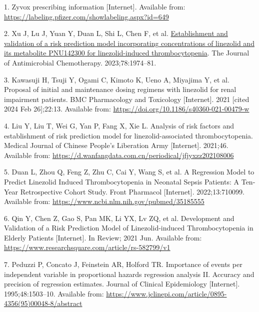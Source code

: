 \documentclass[
  letterpaper,
  DIV=11,
  numbers=noendperiod]{scrartcl}
\newlength{\cslhangindent}
\newenvironment{CSLReferences}[2] %
 {\begin{list}{}{%
  \setlength{\itemindent}{0pt}
  \setlength{\leftmargin}{0pt}
  \setlength{\parsep}{0pt}
  \ifodd #1
   \setlength{\leftmargin}{\cslhangindent}
   \setlength{\itemindent}{-1\cslhangindent}
  \fi
  \setlength{\itemsep}{#2\baselineskip}}}
 {\end{list}}
\begin{document}
\label{refs}
\begin{CSLReferences}{0}{1}
1. Zyvox prescribing information {[}Internet{]}. Available from:
\url{https://labeling.pfizer.com/showlabeling.aspx?id=649}

2. Xu J, Lu J, Yuan Y, Duan L, Shi L, Chen F, et al.
\href{https://doi.org/10.1093/jac/dkad191}{Establishment and validation
of a risk prediction model incorporating concentrations of linezolid and
its metabolite {PNU142300} for linezolid-induced thrombocytopenia}. The
Journal of Antimicrobial Chemotherapy. 2023;78:1974--81.

3. Kawasuji H, Tsuji Y, Ogami C, Kimoto K, Ueno A, Miyajima Y, et al.
Proposal of initial and maintenance dosing regimens with linezolid for
renal impairment patients. BMC Pharmacology and Toxicology
{[}Internet{]}. 2021 {[}cited 2024 Feb 26{]};22:13. Available from:
\url{https://doi.org/10.1186/s40360-021-00479-w}

4. Liu Y, Liu T, Wei G, Yan P, Fang X, Xie L. Analysis of risk factors
and establishment of risk prediction model for linezolid-associated
thrombocytopenia. Medical Journal of Chinese People's Liberation Army
{[}Internet{]}. 2021;46. Available from:
\url{https://d.wanfangdata.com.cn/periodical/jfjyxzz202108006}

5. Duan L, Zhou Q, Feng Z, Zhu C, Cai Y, Wang S, et al. A {Regression}
{Model} to {Predict} {Linezolid} {Induced} {Thrombocytopenia} in
{Neonatal} {Sepsis} {Patients}: {A} {Ten}-{Year} {Retrospective}
{Cohort} {Study}. Front Pharmacol {[}Internet{]}. 2022;13:710099.
Available from: \url{https://www.ncbi.nlm.nih.gov/pubmed/35185555}

6. Qin Y, Chen Z, Gao S, Pan MK, Li YX, Lv ZQ, et al. Development and
{Validation} of a {Risk} {Prediction} {Model} of {Linezolid}-induced
{Thrombocytopenia} in {Elderly} {Patients} {[}Internet{]}. In Review;
2021 Jun. Available from:
\url{https://www.researchsquare.com/article/rs-582799/v1}

7. Peduzzi P, Concato J, Feinstein AR, Holford TR. Importance of events
per independent variable in proportional hazards regression analysis II.
Accuracy and precision of regression estimates. Journal of Clinical
Epidemiology {[}Internet{]}. 1995;48:1503--10. Available from:
\url{https://www.jclinepi.com/article/0895-4356(95)00048-8/abstract}


\end{CSLReferences}
\end{document}
